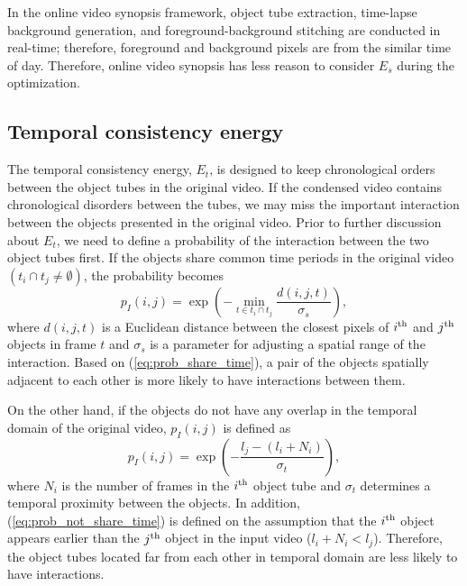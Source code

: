 \documentclass[11pt]{hyu_thesis}
\begin{document}
In the online video synopsis framework, object tube extraction, time-lapse background generation, and foreground-background stitching are conducted in real-time; therefore, foreground and background pixels are from the similar time of day. Therefore, online video synopsis has less reason to consider $E_s$ during the optimization.

\subsection{Temporal consistency energy}
The temporal consistency energy, $E_t$, is designed to keep chronological orders between the object tubes in the original video. If the condensed video contains chronological disorders between the tubes, we may miss the important interaction between the objects presented in the original video. Prior to further discussion about $E_t$, we need to define a probability of the interaction between the two object tubes first. If the objects share common time periods in the original video $(t_i \cap t_j \neq \emptyset)$, the probability becomes
\begin{equation}
\label{eq:prob_share_time}
p_I(i, j) = 
\exp\left(-\min_{t \in t_i \cap t_j} \frac{d(i,j,t)}{\sigma_s}\right),
\end{equation}
where $d(i,j,t)$ is a Euclidean distance between the closest pixels of $i^{\rm{th}}$ and $j^{\rm{th}}$ objects in frame $t$ and $\sigma_s$ is a parameter for adjusting a spatial range of the interaction. Based on (\ref{eq:prob_share_time}), a pair of the objects spatially adjacent to each other is more likely to have interactions between them.

On the other hand, if the objects do not have any overlap in the temporal domain of the original video, $p_I(i,j)$ is defined as
\begin{equation}
\label{eq:prob_not_share_time}
p_I(i,j)=\exp\left(-\frac{l_j - (l_i + N_i)}{\sigma_t}\right),
\end{equation}
where $N_i$ is the number of frames in the $i^{\rm{th}}$ object tube and $\sigma_t$ determines a temporal proximity between the objects. In addition, (\ref{eq:prob_not_share_time}) is defined on the assumption that the $i^{\rm{th}}$ object appears earlier than the $j^{\rm{th}}$ object in the input video ($l_i + N_i < l_j$). Therefore, the object tubes located far from each other in temporal domain are less likely to have interactions.
\end{document}

